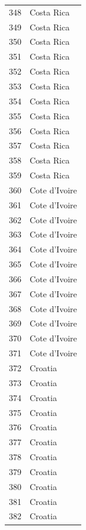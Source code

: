 \documentclass[
  letterpaper,
  DIV=11,
  numbers=noendperiod]{scrreprt}
\begin{document}
\begin{tabular}{ll}
348  &                Costa Rica \\
349  &                Costa Rica \\
350  &                Costa Rica \\
351  &                Costa Rica \\
352  &                Costa Rica \\
353  &                Costa Rica \\
354  &                Costa Rica \\
355  &                Costa Rica \\
356  &                Costa Rica \\
357  &                Costa Rica \\
358  &                Costa Rica \\
359  &                Costa Rica \\
360  &             Cote d'Ivoire \\
361  &             Cote d'Ivoire \\
362  &             Cote d'Ivoire \\
363  &             Cote d'Ivoire \\
364  &             Cote d'Ivoire \\
365  &             Cote d'Ivoire \\
366  &             Cote d'Ivoire \\
367  &             Cote d'Ivoire \\
368  &             Cote d'Ivoire \\
369  &             Cote d'Ivoire \\
370  &             Cote d'Ivoire \\
371  &             Cote d'Ivoire \\
372  &                   Croatia \\
373  &                   Croatia \\
374  &                   Croatia \\
375  &                   Croatia \\
376  &                   Croatia \\
377  &                   Croatia \\
378  &                   Croatia \\
379  &                   Croatia \\
380  &                   Croatia \\
381  &                   Croatia \\
382  &                   Croatia \\

\end{tabular}
\end{document}
